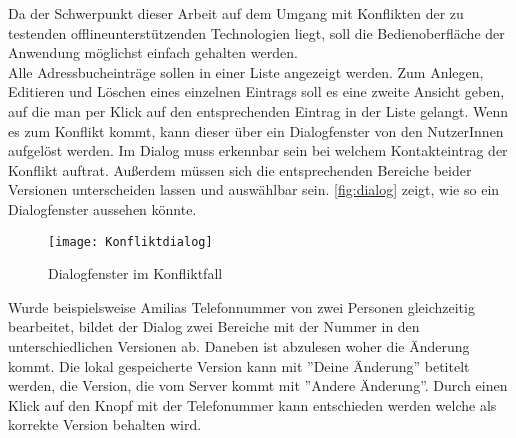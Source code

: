 Da der Schwerpunkt dieser Arbeit auf dem Umgang mit Konflikten der zu testenden offlineunterstützenden Technologien liegt, soll die Bedienoberfläche der Anwendung möglichst einfach gehalten werden.\\
Alle Adressbucheinträge sollen in einer Liste angezeigt werden. Zum Anlegen, Editieren und Löschen eines einzelnen Eintrags soll es eine zweite Ansicht geben, auf die man per Klick auf den entsprechenden Eintrag in der Liste gelangt.
Wenn es zum Konflikt kommt, kann dieser über ein Dialogfenster von den NutzerInnen aufgelöst werden.
Im Dialog muss erkennbar sein bei welchem Kontakteintrag der Konflikt auftrat.
Außerdem müssen sich die entsprechenden Bereiche beider Versionen unterscheiden lassen und auswählbar sein. \autoref{fig:dialog} zeigt, wie so ein Dialogfenster aussehen könnte.
%
\begin{figure}[H]
	\centering
	\texttt{[image: Konfliktdialog]}
	\grayRule
	\caption{Dialogfenster im Konfliktfall}
	\label{fig:dialog}
\end{figure}
%
Wurde beispielsweise Amilias Telefonnummer von zwei Personen gleichzeitig bearbeitet, bildet der Dialog zwei Bereiche mit der Nummer in den unterschiedlichen Versionen ab.
Daneben ist abzulesen woher die Änderung kommt.
Die lokal gespeicherte Version kann mit ''Deine Änderung'' betitelt werden, die Version, die vom Server kommt mit ''Andere Änderung''.
Durch einen Klick auf den Knopf mit der Telefonummer kann entschieden werden welche als korrekte Version behalten wird.